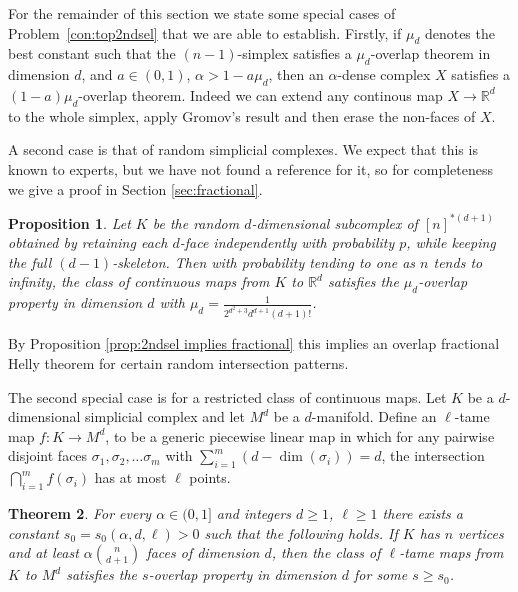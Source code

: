 \documentclass[12pt,a4paper,oneside]{amsart}\sloppy
\newtheorem{theorem}{Theorem}%
\newtheorem{prop}[theorem]{Proposition}
\theoremstyle{definition}
\begin{document}
For the remainder of this section we state some special cases of Problem~\ref{con:top2ndsel} that we are able to establish. Firstly, if $\mu_d$ denotes the best constant such that the $(n-1)$-simplex satisfies a $\mu_d$-overlap theorem in dimension $d$, and $a\in (0,1)$, $\alpha>1-a\mu_d$, then an $\alpha$-dense complex $X$ satisfies a $(1-a)\mu_d$-overlap theorem. Indeed we can extend any continous map $X\to \mathbb R^d$ to the whole simplex, apply Gromov's result and then erase the non-faces of $X$. 

A second case is that of random simplicial complexes. We expect that this is known to experts, but we have not found a reference for it, so for completeness we give a proof in Section \ref{sec:fractional}. 

\begin{prop}\label{prop:random} Let \(K\) be the
random \(d\)-dimensional subcomplex of $[n]^{*(d+1)}$ obtained by retaining each \(d\)-face 
independently with probability \(p\), while keeping the full
\((d-1)\)-skeleton. Then with probability tending to one as $n$ tends to infinity, the class of continuous maps from $K$ to $\mathbb R^d$ satisfies the $\mu_d$-overlap property in dimension $d$ with $\mu_d=\frac{1}{2^{d^2+3}d^{d+1}(d+1)!}$. 
\end{prop}




By Proposition \ref{prop:2ndsel implies fractional} this implies an overlap fractional Helly theorem for certain random intersection patterns. 

The second special case is for a restricted class of continuous maps. Let $K$ be a $d$-dimensional simplicial complex and let $M^d$ be a $d$-manifold. Define an $\ell$-tame map  $f \colon K \to M^d$, to be a generic piecewise linear map in which for any pairwise disjoint faces $\sigma_1,\sigma_2, \ldots \sigma_m$ with $\sum_{i=1}^{m}(d-\dim(\sigma_i))=d$, the intersection $\bigcap_{i=1}^{m} f(\sigma_i)$ has at most $\ell$ points.

\begin{theorem}\label{tame} For every $\alpha\in (0,1]$ and integers $d\geq 1$, $\ell\geq 1$ there exists a constant $s_0 = s_0(\alpha,d,\ell)>0$ such that the following holds. If $K$ has $n$ vertices and at least $\alpha \binom{n}{d+1}$ faces of dimension $d$, then the class of $\ell$-tame maps from $K$ to $M^d$ satisfies the $s$-overlap property in dimension $d$ for some $s\geq s_0$.
\end{theorem}
\end{document}
